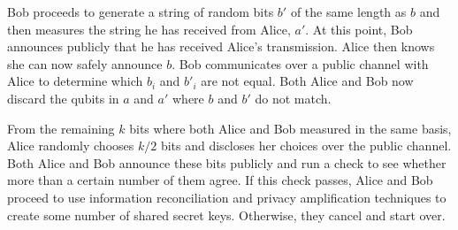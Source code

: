 \documentclass[12pt]{article}
\theoremstyle{definition}
\begin{document}
	Bob proceeds to generate a string of random bits $b'$ of the same length as $b$ and then measures the string he has received from Alice, $a'$. At this point, Bob announces publicly that he has received Alice's transmission. Alice then knows she can now safely announce $b$. Bob communicates over a public channel with Alice to determine which $b_{i}$ and $b'_{i}$ are not equal. Both Alice and Bob now discard the qubits in $a$ and $a'$ where $b$ and $b'$ do not match.
	
	From the remaining $k$ bits where both Alice and Bob measured in the same basis, Alice randomly chooses $k/2$ bits and discloses her choices over the public channel. Both Alice and Bob announce these bits publicly and run a check to see whether more than a certain number of them agree. If this check passes, Alice and Bob proceed to use information reconciliation and privacy amplification techniques to create some number of shared secret keys. Otherwise, they cancel and start over.
	
\end{document}
